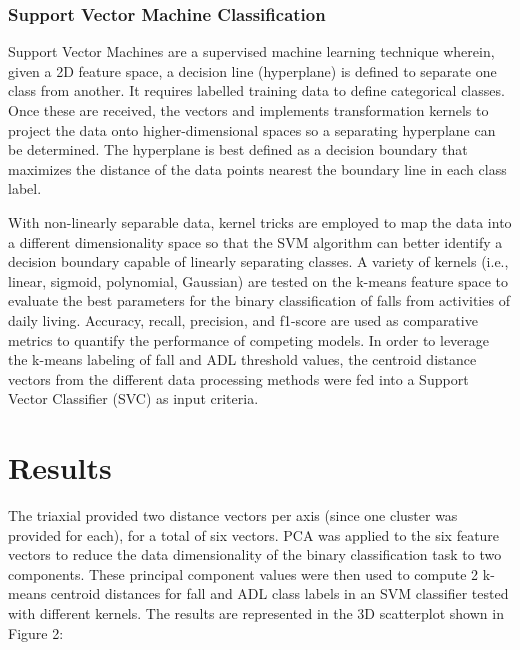 \documentclass{llncs}
\begin{document}
\subsubsection{Support Vector Machine Classification} 
	Support Vector Machines are a supervised machine learning technique wherein, given a 2D feature space, a decision line (hyperplane) is defined to separate one class from another. It requires labelled training data to define categorical classes. Once these are received, the vectors  and implements transformation kernels to project the data onto higher-dimensional spaces so a separating hyperplane can be determined. The hyperplane is best defined as a decision boundary that maximizes the distance of the data points nearest the boundary line in each class label. 

	With non-linearly separable data, kernel tricks are employed to map the data into a different dimensionality space so that the SVM algorithm can better identify a decision boundary capable of linearly separating classes. A variety of kernels (i.e., linear, sigmoid, polynomial, Gaussian) are tested on the k-means feature space to evaluate the best parameters for the binary classification of falls from activities of daily living. Accuracy, recall, precision, and f1-score are used as comparative metrics to quantify the performance of competing models. In order to leverage the k-means labeling of fall and ADL threshold values, the centroid distance vectors from the different data processing methods were fed into a Support Vector Classifier (SVC) as input criteria.


    
\section{Results}

The triaxial provided two distance vectors per axis (since one cluster was provided for each), for a total of six vectors. PCA was applied to the six feature vectors to reduce the data dimensionality of the binary classification task to two components. These principal component values were then used to compute 2 k-means centroid distances for fall and ADL class labels in an SVM classifier tested with different kernels. The results are represented in the 3D scatterplot shown in Figure 2:
\end{document}
